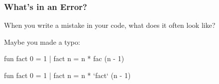 \documentclass[aspectratio=169, handout]{beamer}
\newcommand{\cmark}{{\color{green!80!black}\ding{51}}}
\newcommand{\xmark}{{\color{red}\ding{55}}}
\begin{document}
\begin{frame}[fragile]
  \frametitle{What's in an Error?}

  When you write a mistake in your code, what does it often look like?

  \pause
  \vspace{\fill}

  Maybe you made a typo:

  \begin{center}
    \begin{minipage}[t][0.7in][t]{\textwidth}
      \begin{minipage}{0.2\textwidth}
        \centering
        \vspace{\fill}
        {\huge\xmark}
        \vspace{\fill}
      \end{minipage}
      \begin{minipage}{0.75\textwidth}
        {\small
        \begin{codeblock}[rulecolor=\color{red}, framerule=0.3mm]
          fun fact 0 = 1
            | fact n = n * fac (n - 1)
        \end{codeblock}
        }
      \end{minipage}
    \end{minipage}
    \pause
    \begin{minipage}[t][0.7in][t]{\textwidth}
      \begin{minipage}{0.2\textwidth}
        \centering
        \vspace{\fill}
        {\huge\cmark}
        \vspace{\fill}
      \end{minipage}
      \begin{minipage}{0.75\textwidth}
        {\small
        \begin{codeblock}[rulecolor=\color{green!80!black}, framerule=0.3mm]
          fun fact 0 = 1
            | fact n = n * `fact` (n - 1)
        \end{codeblock}
        }
      \end{minipage}
    \end{minipage}
  \end{center}
\end{frame}
\end{document}
